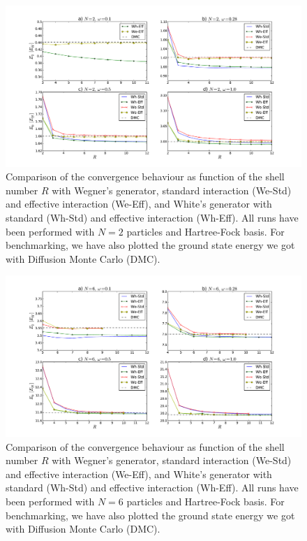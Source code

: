 \begin{figure}
\begin{center}
\includegraphics[scale=0.42]{../Plots/compWhiteWegner2.pdf}
\end{center}
\caption{Comparison of the convergence behaviour as function of the shell number $R$ with Wegner's generator, standard interaction (We-Std) and effective interaction (We-Eff), and White's generator with standard (Wh-Std) and effective interaction (Wh-Eff). All runs have been performed with $N=2$ particles and Hartree-Fock basis. For benchmarking, we have also plotted the ground state energy we got with Diffusion Monte Carlo (DMC). }
\label{fig:compWhiteWegner2}
\end{figure}

\begin{figure}
\begin{center}
\includegraphics[scale=0.42]{../Plots/compWhiteWegner6.pdf}
\end{center}
\caption{Comparison of the convergence behaviour as function of the shell number $R$ with Wegner's generator, standard interaction (We-Std) and effective interaction (We-Eff), and White's generator with standard (Wh-Std) and effective interaction (Wh-Eff). All runs have been performed with $N=6$ particles and Hartree-Fock basis. For benchmarking, we have also plotted the ground state energy we got with Diffusion Monte Carlo (DMC). }
\label{fig:compWhiteWegner6}
\end{figure}

